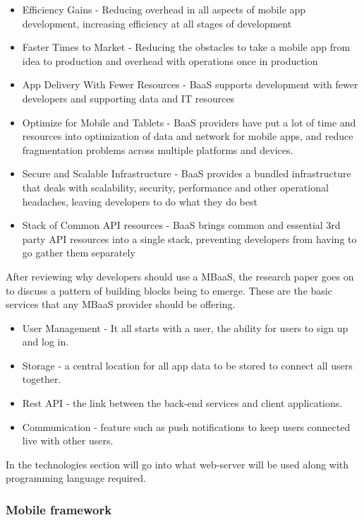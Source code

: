 \begin{itemize}
  \item Efficiency Gains
    - Reducing overhead in all aspects of mobile app development, increasing efficiency at all stages of development
  \item Faster Times to Market
    - Reducing the obstacles to take a mobile app from idea to production and overhead with operations once in production
  \item App Delivery With Fewer Resources
    - BaaS supports development with fewer developers and supporting data and IT resources
  \item Optimize for Mobile and Tablets
    - BaaS providers have put a lot of time and resources into optimization of data and network for mobile apps, and reduce fragmentation problems across multiple platforms and devices.
  \item Secure and Scalable Infrastructure
    -  BaaS provides a bundled infrastructure that deals with scalability, security, performance and other operational headaches, leaving developers to do what they do best
  \item Stack of Common API resources 
    - BaaS brings common and essential 3rd party API resources into a single stack, preventing developers from having to go gather them separately
\end{itemize}

After reviewing why developers should use a MBaaS, the research paper goes on to discuss a pattern of building blocks being to emerge. These are the basic services that any MBaaS provider should be offering.

\begin{itemize}
  \item User Management
    - It all starts with a user, the ability for users to sign up and log in.
  \item Storage
    - a central location for all app data to be stored to connect all users together.
  \item Rest API
    - the link between the back-end services and client applications.
  \item Communication
    - feature such as push notifications to keep users connected live with other users.
\end{itemize}

In the technologies section will go into what web-server will be used along with programming language required. 

\subsubsection{Mobile framework}

